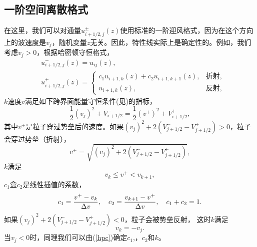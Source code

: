 \subsection{一阶空间离散格式}
在这里，我们可以对通量$u^{\pm}_{i+1/2, j}(z)$使用标准的一阶迎风格式，因为在这个方向上的波速度是$v_j$，随机变量$z$无关。因此，特性线实际上是确定性的。例如，我们考虑$v_j>0$，根据哈密顿守恒格式，
\begin{equation}\label{cck}
  \begin{aligned}
    &u^-_{i+1/2,j}(z) = u_{ij}(z), \\
    &u^+_{i+1/2,j}(z) = 
    \begin{cases}
      c_1 u_{i+1,k}(z) + c_2 u_{i+1,k+1}(z), &\text{折射}, \\
      u_{i+1, k}(z), &\text{反射},
    \end{cases}
  \end{aligned}
\end{equation}
$k$速度$v$满足如下跨界面能量守恒条件(见)的指标，
\begin{equation}\label{hpc}
  \frac{1}{2}(v_j)^2 + V^-_{i+1/2} = \frac{1}{2}(v^+)^2 + V^+_{i+1/2},
\end{equation}
其中$v^+$是粒子穿过势垒后的速度。如果$(v_j)^2 + 2(V^-_{j+1/2} - V^+_{j+1/2})>0$，粒子会穿过势垒（折射），
\begin{equation}
  v^+ = \sqrt{(v_j)^2 + 2(V^-_{j+1/2} - V^+_{j+1/2})},
\end{equation}
$k$满足
\begin{equation}
  v_k\leq v^+ < v_{k+1},
\end{equation}
$c_1$盒$c_2$是线性插值的系数，
\begin{equation}
  c_1 = \frac{v^+ - v_k}{\Delta v}, \quad c_2 = \frac{v_{k+1} - v^+}{\Delta v}, \quad c_1 + c_2 = 1.
\end{equation}
如果$(v_j)^2 + 2(V^-_{j+1/2} - V^+_{j+1/2})<0$，粒子会被势垒反射，
这时$k$满足
\begin{equation}\label{-j}
  v_k = -v_j.
\end{equation}
当$v_j<0$时，同理我们可以由(\ref{hpc})确定$c_1$,，$c_2$和$k$。

